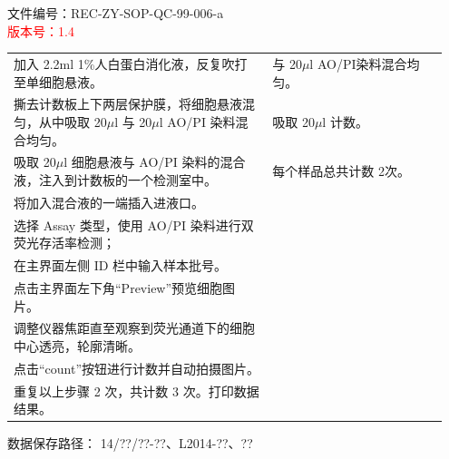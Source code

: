 \documentclass[UTF8,10pt,a4paper,fontset=fandol]{ctexart}
\newcommand{\fieldvalue}[1]{#1}
\newcommand{\handwritten}[1]{#1}
\begin{document}
\noindent
\begin{minipage}{\linewidth}
\small
\begin{flushright}
文件编号：REC-ZY-SOP-QC-99-006-a\\
\textcolor{red}{版本号：1.4}
\end{flushright}

\noindent
\begin{tabular}{p{0.57\linewidth}|p{0.38\linewidth}}
加入 2.2ml 1\%人白蛋白消化液，反复吹打至单细胞悬液。 & 与
\fieldvalue{\handwritten{20}}$\mu$l AO/PI染料混合均匀。\\
撕去计数板上下两层保护膜，将细胞悬液混匀，从中吸取 20$\mu$l 与 20$\mu$l AO/PI 染料混合均匀。 & 吸取
\fieldvalue{\handwritten{20}}$\mu$l 计数。\\
吸取 20$\mu$l 细胞悬液与 AO/PI 染料的混合液，注入到计数板的一个检测室中。 & 每个样品总共计数
\fieldvalue{\handwritten{2}}次。\\
将加入混合液的一端插入进液口。 & \\
选择 Assay 类型，使用 AO/PI 染料进行双荧光存活率检测； & \\
在主界面左侧 ID 栏中输入样本批号。 & \\
点击主界面左下角“Preview”预览细胞图片。 & \\
调整仪器焦距直至观察到荧光通道下的细胞中心透亮，轮廓清晰。 & \\
点击“count”按钮进行计数并自动拍摄图片。 & \\
重复以上步骤 2 次，共计数 3 次。打印数据结果。 & \\
\end{tabular}

\vspace{2pt}
\noindent
数据保存路径：
\fieldvalue{\handwritten{14/??/??-??、L2014-??、??}}


\end{minipage}
\end{document}
